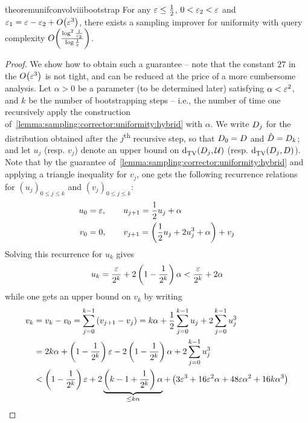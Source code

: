 \begin{restatable}{theorem}{unifconvolviiibootstrap}\label{lemma:sampling:corrector:uniformity:boostrap}
  For any $\varepsilon\leq \frac{1}{2}$, $0<\varepsilon_2<\varepsilon$ and $\eps_1=\eps-\eps_2+\bigO{\eps^3}$, there exists a sampling improver for uniformity with query complexity $\bigO{\frac{\log^2\frac{1}{\eps_2}}{\log\frac{1}{\eps}}}$.
\end{restatable}
\begin{proof}
We show how to obtain such a guarantee -- note that the constant $27$ in the $\bigO{\eps^3}$ is not tight, and can be reduced at the price of a more cumbersome analysis. Let $\alpha > 0$ be a parameter (to be determined later) satisfying $\alpha < \varepsilon^2$, and $k$ be the number of bootstrapping steps -- i.e., the number of time one recursively apply the construction of~\autoref{lemma:sampling:corrector:uniformity:hybrid} with $\alpha$. We write $D_j$ for the distribution obtained after the $j$\textsuperscript{th} recursive step, so that $D_0=D$ and $\hat{D}=D_k$; and let $u_j$ (resp. $v_j$) denote an upper bound on ${\operatorname{d}_{\textrm{TV}}^{}\!\left({D_j, \mathcal{U}}\right)}$ (resp. ${\operatorname{d}_{\textrm{TV}}^{}\!\left({D_j, D}\right)}$). Note that by the guarantee of~\autoref{lemma:sampling:corrector:uniformity:hybrid} and applying a triangle inequality for $v_j$, one gets the following recurrence relations for $(u_j)_{0\leq j\leq k}$ and $(v_j)_{0\leq j\leq k}$:
\begin{align*}
  u_0 &= \varepsilon,\qquad u_{j+1}=\frac{1}{2}u_j + \alpha\\
  v_0 &= 0,\qquad v_{j+1}=\left(\frac{1}{2}u_j + 2u_j^3+\alpha\right) + v_j
\end{align*}
Solving this recurrence for $u_k$ gives
\begin{equation}\label{eq:sampling:corrector:uniformity:boostrap:uk}
  u_k = \frac{\varepsilon}{2^k}+2\left( 1-\frac{1}{2^k} \right)\alpha < \frac{\varepsilon}{2^k}+2\alpha
\end{equation}
while one gets an upper bound on $v_k$ by writing
\begin{align*}
  v_k &= v_k -v_0 = \sum_{j=0}^{k-1} \left( v_{j+1} - v_j \right) = k\alpha + \frac{1}{2}\sum_{j=0}^{k-1} u_j + 2\sum_{j=0}^{k-1}u_j^3 \\
  &= 2k\alpha + \left( 1-\frac{1}{2^k} \right)\eps - 2\left( 1-\frac{1}{2^k} \right)\alpha + 2\sum_{j=0}^{k-1}u_j^3 \\
  &< \left( 1-\frac{1}{2^k} \right)\eps + 2\underbrace{\left( k-1+\frac{1}{2^k} \right)\alpha}_{\leq k\alpha} + \left( 3\eps^3+16\eps^2\alpha+48\eps\alpha^2+16k\alpha^3 \right)

\end{align*}
\end{proof}
